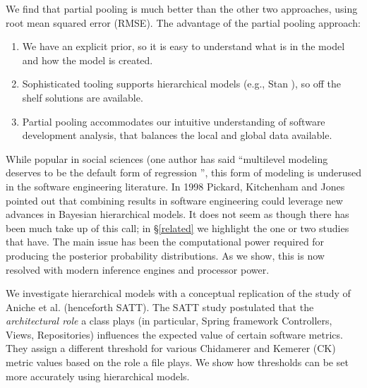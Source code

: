 \documentclass[sigconf,natbib=false]{acmart}
\begin{document}
We find that partial pooling is much better than the other two approaches, using
root mean squared error (RMSE). The advantage of the partial pooling approach: 
\begin{enumerate}
	\item We have an explicit prior, so it is easy to understand what is in the model and how the model is created. 
	\item Sophisticated tooling supports hierarchical models (e.g., Stan \cite{Carpenter2017}), so off
	the shelf solutions are available.
	\item Partial pooling accommodates our intuitive understanding of software development analysis, that balances the local and global data available.
\end{enumerate}

While popular in social sciences (one author has said ``multilevel modeling
deserves to be the default form of regression \cite[p.14]{mcilreath16}'', this
form of modeling is underused in the software engineering literature. In 1998
Pickard, Kitchenham and Jones \cite{PICKARD1998811} pointed out that combining
results in software engineering could leverage new advances in Bayesian
hierarchical models. It does not seem as though there has been much take up of
this call; in \S \ref{related} we highlight the one or two studies that have.
The main issue has been the computational power required for producing the
posterior probability distributions. As we show, this is now resolved with
modern inference engines and processor power. 

We investigate hierarchical models with a conceptual replication of the study of
Aniche et al. \cite{Aniche2016} (henceforth SATT). The SATT study postulated
that the \emph{architectural role} a class plays (in particular, Spring
framework Controllers, Views, Repositories) influences the expected value of
certain software metrics. They assign a different threshold for various
Chidamerer and Kemerer (CK) metric values \cite{Chidamber_1991} based on the
role a file plays. We show how thresholds can be set more accurately using
hierarchical models.

\end{document}
